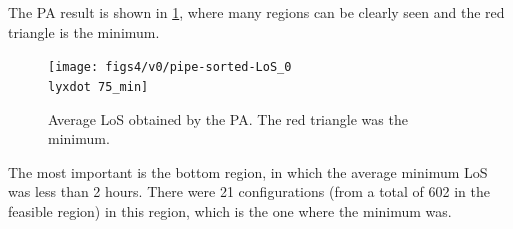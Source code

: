 The PA result is shown in \ref{subfig:pipe13-1}, where many regions
can be clearly seen and the red triangle is the minimum. 
\begin{figure}[H]
\noindent \begin{centering}
\texttt{[image: figs4/v0/pipe-sorted-LoS\_0\\lyxdot 75\_min]}
\par\end{centering}

\caption{Average LoS obtained by the PA. The red triangle was the minimum.
\label{subfig:pipe13-1}}
\end{figure}
 The most important is the bottom region, in which the average minimum
LoS was less than 2 hours. There were 21 configurations (from a total
of 602 in the feasible region) in this region, which is the one where
the minimum was.

